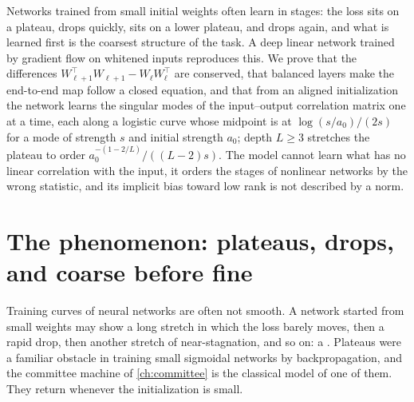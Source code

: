 \newcommand{\dlS}{\Sigma_{yx}}
\newcommand{\dlE}{\mathcal{E}}
\newcommand{\dlhalf}{t_{1/2}}
\newcommand{\dlLzero}{\Loss_0}

\begin{refsection}

\begin{chaptersummary}
Networks trained from small initial weights often learn in stages: the loss sits on a plateau, drops quickly, sits on a lower plateau, and drops again, and what is learned first is the coarsest structure of the task. A deep linear network trained by gradient flow on whitened inputs reproduces this. We prove that the differences $W_{\ell+1}^\top W_{\ell+1}-W_\ell W_\ell^\top$ are conserved, that balanced layers make the end-to-end map follow a closed equation, and that from an aligned initialization the network learns the singular modes of the input--output correlation matrix one at a time, each along a logistic curve whose midpoint is at $\log(s/a_0)/(2s)$ for a mode of strength $s$ and initial strength $a_0$; depth $L\ge3$ stretches the plateau to order $a_0^{-(1-2/L)}/((L-2)s)$. The model cannot learn what has no linear correlation with the input, it orders the stages of nonlinear networks by the wrong statistic, and its implicit bias toward low rank is not described by a norm.
\end{chaptersummary}

\section{The phenomenon: plateaus, drops, and coarse before fine}\label{sec:deeplinear:phenomenon}

Training curves of neural networks are often not smooth. A network started from small weights may show a long stretch in which the loss barely moves, then a rapid drop, then another stretch of near-stagnation, and so on: a . Plateaus were a familiar obstacle in training small sigmoidal networks by backpropagation, and the committee machine of \cref{ch:committee} is the classical model of one of them. They return whenever the initialization is small.


\end{refsection}
